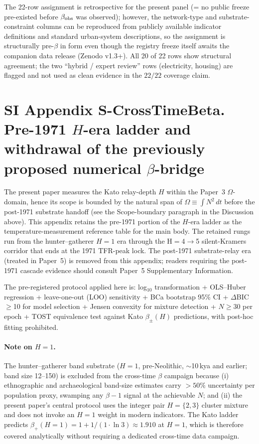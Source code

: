 The 22-row assignment is retrospective for the present panel (= no public freeze pre-existed before \(\beta_{\rm obs}\) was observed); however, the network-type and substrate-constraint columns can be reproduced from publicly available indicator definitions and standard urban-system descriptions, so the assignment is structurally pre-\(\beta\) in form even though the registry freeze itself awaits the companion data release (Zenodo v1.3+). All 20 of 22 rows show structural agreement; the two ``hybrid / expert review'' rows (electricity, housing) are flagged and not used as clean evidence in the \(22/22\) coverage claim.

\section*{SI Appendix S-CrossTimeBeta. Pre-1971 \(H\)-era ladder and withdrawal of the previously proposed numerical \(\beta\)-bridge}\label{sec:S-CrossTimeBeta}

The present paper measures the Kato relay-depth \(H\) within the Paper~3 \(\Omega\)-domain, hence its scope is bounded by the natural span of \(\Omega\equiv\int N^{2}\,dt\) before the post-1971 substrate handoff (see the Scope-boundary paragraph in the Discussion above). This appendix retains the pre-1971 portion of the \(H\)-era ladder as the temperature-measurement reference table for the main body. The retained rungs run from the hunter--gatherer \(H{=}1\) era through the H${=}$4$\to$5 silent-Kramers corridor that ends at the 1971 TFR-peak lock. The post-1971 substrate-relay era (treated in Paper~5) is removed from this appendix; readers requiring the post-1971 cascade evidence should consult Paper~5 Supplementary Information.

The pre-registered protocol applied here is: log\(_{10}\) transformation + OLS--Huber regression + leave-one-out (LOO) sensitivity + BCa bootstrap 95\% CI + \(\Delta\)BIC\(\geq\)10 for model selection + Jensen convexity for mixture detection + \(N\geq30\) per epoch + TOST equivalence test against Kato \(\beta_{\pm}(H)\) predictions, with post-hoc fitting prohibited.

\paragraph{Note on $H{=}1$.} The hunter--gatherer band substrate ($H{=}1$, pre-Neolithic, $\sim$10\,kya and earlier; band size 12--150) is excluded from the cross-time $\beta$ campaign because (i) ethnographic and archaeological band-size estimates carry $>50\%$ uncertainty per population proxy, swamping any $\beta\!-\!1$ signal at the achievable $N$; and (ii) the present paper's central protocol uses the integer pair $H{=}\{2,3\}$ cluster mixture and does not invoke an $H{=}1$ weight in modern indicators. The Kato ladder predicts $\beta_+(H{=}1)=1+1/(1\cdot\ln 3)\approx 1.910$ at $H{=}1$, which is therefore covered analytically without requiring a dedicated cross-time data campaign.

